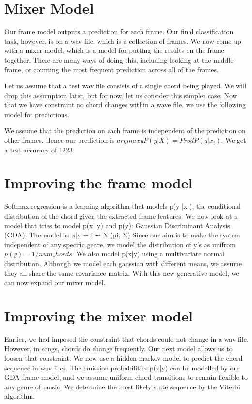 \documentclass{article}
\begin{document}
\section{Mixer Model}
Our frame model outputs a prediction for each frame. Our final classification task, however, is on a wav file, which is a collection of frames. We now come up with a mixer model, which is a model for putting the results on the frame together. There are many ways of doing this, including looking at the middle frame, or counting the most frequent prediction across all of the frames.

Let us assume that a test wav file consists of a single chord being played. We will drop this assumption later, but for now, let us consider this simpler case. Now that we have constraint no chord changes within a wave file, we use the following model for predictions.

We assume that the prediction on each frame is independent of the prediction on other frames.
Hence our prediction is $argmax y P(y | X) = Prod P(y | x_i)$. We get a test accuracy of 1223%

\section{Improving the frame model}
Softmax regression is a learning algorithm that models p(y |x ), the conditional distribution of the chord given the extracted frame features. We now look at a model that tries to model p(x| y) and p(y): Gaussian Discriminant Analysis (GDA). The model is:
x|y = i ∼ N (µi, Σ)
Since our aim is to make the system independent of any specific genre, we model the distribution of y’s as unifrom $p(y) = 1/num_chords$. We also model p(x|y) using a multivariate normal distribution. Although we model each gaussian with different means, we assume they all share the same covariance matrix. With this new generative model, we can now expand our mixer model.

\section{Improving the mixer model}
Earlier, we had imposed the constraint that chords could not change in a wav file. However, in songs, chords do change frequently. Our next model allows us to loosen that constraint. We now use a hidden markov model to predict the chord sequence in wav files. The emission probabilities p(x|y) can be modelled by our GDA frame model, and we assume uniform chord transitions to remain flexible to any genre of music. We determine the most likely state sequence by the Viterbi algorithm.
\end{document}
